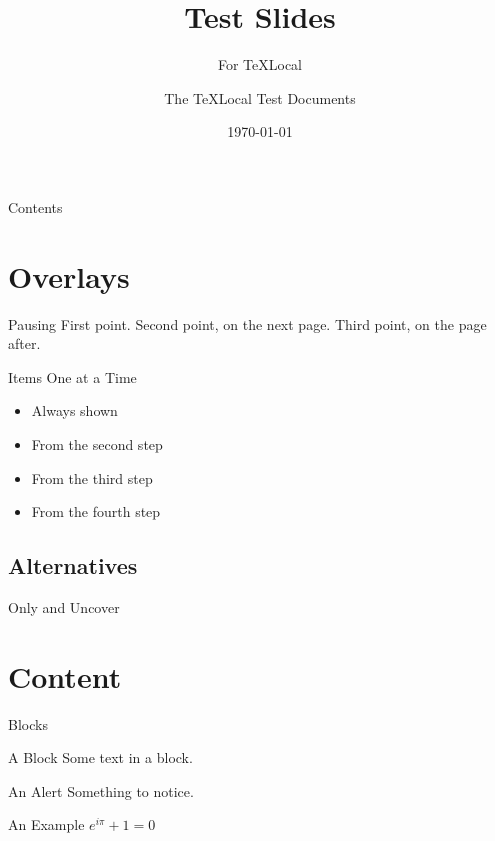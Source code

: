 \documentclass[aspectratio=169]{beamer}
\title{Test Slides}
\subtitle{For TeXLocal}
\author{The TeXLocal Test Documents}
\date{\today}
\begin{document}
\begin{frame}
  \titlepage
\end{frame}

\begin{frame}{Contents}
  \tableofcontents
\end{frame}

\section{Overlays}

\begin{frame}{Pausing}
  First point.
  \pause
  Second point, on the next page.
  \pause
  Third point, on the page after.
\end{frame}

\begin{frame}{Items One at a Time}
  \begin{itemize}
    \item<1-> Always shown
    \item<2-> From the second step
    \item<3-> From the third step
    \item<4-> From the fourth step
  \end{itemize}
\end{frame}

\subsection{Alternatives}
\begin{frame}{Only and Uncover}
\end{frame}

\section{Content}

\begin{frame}{Blocks}
  \begin{block}{A Block}
    Some text in a block.
  \end{block}
  \begin{alertblock}{An Alert}
    Something to notice.
  \end{alertblock}
  \begin{exampleblock}{An Example}
    $e^{i\pi} + 1 = 0$
  \end{exampleblock}
\end{frame}
\end{document}
